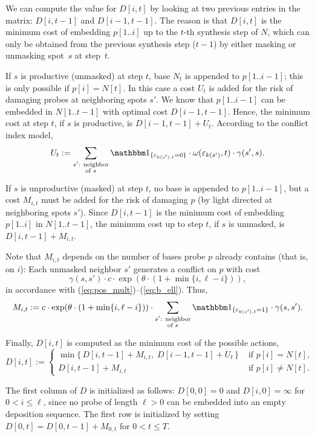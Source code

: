 We can compute the value for $D[i,t]$ by looking at two previous entries in the
matrix: $D[i,t-1]$ and $D[i-1,t-1]$. The reason is that $D[i,t]$ is the minimum
cost of embedding $p[1..i]$ up to the $t$-th synthesis step of $N$, which can
only be obtained from the previous synthesis step ($t-1$) by either masking or
unmasking spot~$s$ at step~$t$.

If $s$ is productive (unmasked) at step $t$, base $N_t$ is appended to
$p[1..i-1]$; this is only possible if $p[i]=N[t]$. In this case a cost $U_t$ is
added for the risk of damaging probes at neighboring spots $s'$. We know that
$p[1..i-1]$ can be embedded in $N[1..t-1]$ with optimal cost $D[i-1,t-1]$.
Hence, the minimum cost at step $t$, if $s$ is productive, is $D[i-1,t-1] +
U_t$.  According to the conflict index model,
\[
U_t := \sum_{\substack{s'\text{: neighbor}\\\text{of } s}}
  \Ind{\eps_{k(s'),t}=0}
  \cdot \omega(\eps_{k(s')},t)
  \cdot \gamma(s',s).
\]

If $s$ is unproductive (masked) at step $t$, no base is appended to $p[1..i-1]$,
but a cost $M_{i,t}$ must be added for the risk of damaging $p$ (by light
directed at neighboring spots $s'$). Since $D[i,t-1]$ is the minimum cost of
embedding $p[1..i]$ in $N[1..t-1]$, the minimum cost up to step $t$, if $s$ is
unmasked, is $D[i,t-1] + M_{i,t}$.

Note that $M_{i,t}$ depends on the number of bases probe $p$ already contains
(that is, on $i$): Each unmasked neighbor $s'$ generates a conflict on $p$ with
cost
\[
\gamma(s,s') \cdot c \cdot \exp(\theta\cdot (1+\min\{i,\ell-i\})),
\]
in accordance with (\ref{eq:pos_mult})--(\ref{eq:b_ell}). Thus,
\[
M_{i,t} := c \cdot \exp(\theta\cdot (1+\min\{i,\ell-i\})) \cdot
\sum_{\substack{s'\text{: neighbor}\\\text{of } s}}
\Ind{\eps_{k(s'),t}=1}  \cdot \gamma(s,s').
\]

Finally, $D[i,t]$ is computed as the minimum cost of the possible actions,
\[
D[i,t] := \begin{cases}
  \min \{\, D[i,t-1] + M_{i,t},\;  D[i-1,t-1] + U_t \,\}
  & \text{ if $p[i]=N[t]$,}\\
  D[i,t-1] + M_{i,t}
  & \text{ if $p[i]\neq N[t]$.}
  \end{cases}
\]

The first column of $D$ is initialized as follows: $D[0,0] = 0$ and
$D[i,0] = \infty$ for $0 < i \leq \ell$, since no probe of length $\ell > 0$ can
be embedded into an empty deposition sequence. The first row is initialized by
setting $D[0,t] = D[0,t-1]+M_{0,t}$ for $0<t\leq T$.

